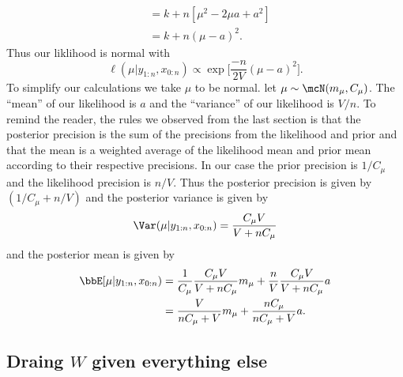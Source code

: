 \documentclass{article}
\begin{document}
\begin{align*}
& = k + n [ \mu^2 - 2 \mu a + a^2 ] \\
& = k + n (\mu - a)^2.
\end{align*}
Thus our liklihood is normal with
\[
\ell (\mu | y_{1:n}, x_{0:n}) \propto
\exp \Big[ \frac{-n}{2V} (\mu - a)^2 \Big].
\]
To simplify our calculations we take $\mu$ to be normal.  let $\mu \sim \mcN(m_\mu, C_\mu)$.  The ``mean'' of our likelihood is $a$ and the ``variance'' of our likelihood is $V/n$.  To remind the reader, the rules we observed from the last section is that the posterior precision is the sum of the precisions from the likelihood and prior and that the mean is a weighted average of the likelihood mean and prior mean according to their respective precisions.  In our case the prior precision is $1/C_\mu$ and the likelihood precision is $n/V$.  Thus the posterior precision is given by $(1/C_\mu + n/V)$ and the posterior variance is given by
\[
\Var(\mu | y_{1:n}, x_{0:n}) = \frac{C_\mu V}{V+ n C_\mu}
\]
and the posterior mean is given by
\begin{align*}
\bbE[\mu | y_{1:n}, x_{0:n}) 
& = \frac{1}{C_\mu} \frac{C_\mu V}{V+ n C_\mu} m_\mu + \frac{n}{V} \frac{C_\mu V}{V+ n C_\mu} a \\
& = \frac{V}{n C_\mu + V} m_\mu + \frac{n C_\mu}{n C_\mu + V} a.
\end{align*}

\subsection{Draing $W$ given everything else}
\end{document}
